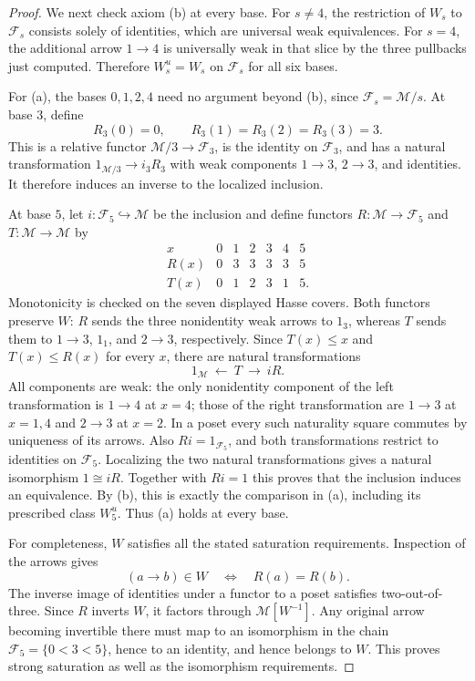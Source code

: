 \begin{proof}
We next check axiom (b) at every base. For $s\ne4$, the restriction of $W_s$ to $\mathcal F_s$ consists solely of identities, which are universal weak equivalences. For $s=4$, the additional arrow $1\to4$ is universally weak in that slice by the three pullbacks just computed. Therefore $W_s^u=W_s$ on $\mathcal F_s$ for all six bases.

For (a), the bases $0,1,2,4$ need no argument beyond (b), since $\mathcal F_s=\mathcal M/s$. At base $3$, define
\[
 R_3(0)=0,\qquad R_3(1)=R_3(2)=R_3(3)=3.
\]
This is a relative functor $\mathcal M/3\to\mathcal F_3$, is the identity on $\mathcal F_3$, and has a natural transformation $1_{\mathcal M/3}\to i_3R_3$ with weak components $1\to3$, $2\to3$, and identities. It therefore induces an inverse to the localized inclusion.

At base $5$, let $i:\mathcal F_5\hookrightarrow\mathcal M$ be the inclusion and define functors $R:\mathcal M\to\mathcal F_5$ and $T:\mathcal M\to\mathcal M$ by
\[
\begin{array}{c|rrrrrr}
x&0&1&2&3&4&5\\ \hline
R(x)&0&3&3&3&3&5\\
T(x)&0&1&2&3&1&5 .
\end{array}
\]
Monotonicity is checked on the seven displayed Hasse covers. Both functors preserve $W$: $R$ sends the three nonidentity weak arrows to $1_3$, whereas $T$ sends them to $1\to3$, $1_1$, and $2\to3$, respectively. Since $T(x)\leq x$ and $T(x)\leq R(x)$ for every $x$, there are natural transformations
\[
 1_{\mathcal M}\ \longleftarrow\ T\ \longrightarrow\ iR.
\]
All components are weak: the only nonidentity component of the left transformation is $1\to4$ at $x=4$; those of the right transformation are $1\to3$ at $x=1,4$ and $2\to3$ at $x=2$. In a poset every such naturality square commutes by uniqueness of its arrows. Also $Ri=1_{\mathcal F_5}$, and both transformations restrict to identities on $\mathcal F_5$. Localizing the two natural transformations gives a natural isomorphism $1\cong iR$. Together with $Ri=1$ this proves that the inclusion induces an equivalence. By (b), this is exactly the comparison in (a), including its prescribed class $W_5^u$. Thus (a) holds at every base.

For completeness, $W$ satisfies all the stated saturation requirements. Inspection of the arrows gives
\[
 (a\to b)\in W\quad\Longleftrightarrow\quad R(a)=R(b).
\]
The inverse image of identities under a functor to a poset satisfies two-out-of-three. Since $R$ inverts $W$, it factors through $\mathcal M[W^{-1}]$. Any original arrow becoming invertible there must map to an isomorphism in the chain $\mathcal F_5=\{0<3<5\}$, hence to an identity, and hence belongs to $W$. This proves strong saturation as well as the isomorphism requirements.


\end{proof}
